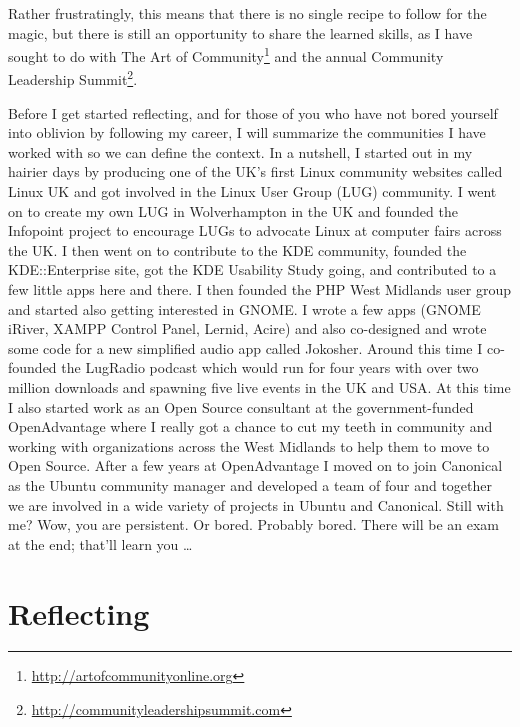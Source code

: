 Rather frustratingly, this means that there is no single recipe to follow for
the magic, but there is still an opportunity to share the learned skills, as I
have sought to do with The Art of
Community\footnote{\url{http://artofcommunityonline.org}} and the annual
Community Leadership
Summit\footnote{\url{http://communityleadershipsummit.com}}.

Before I get started reflecting, and for those of you who have not bored
yourself into oblivion by following my career, I will summarize the communities
I have worked with so we can define the context. In a nutshell, I started out in
my hairier days by producing one of the UK’s first Linux community websites
called Linux UK and got involved in the Linux User Group (LUG) community. I went
on to create my own LUG in Wolverhampton in the UK and founded the Infopoint
project to encourage LUGs to advocate Linux at computer fairs across the UK. I
then went on to contribute to the KDE community, founded the KDE::Enterprise
site, got the KDE Usability Study going, and contributed to a few little apps
here and there. I then founded the PHP West Midlands user group and started also
getting interested in GNOME. I wrote a few apps (GNOME iRiver, XAMPP Control
Panel, Lernid, Acire) and also co-designed and wrote some code for a new
simplified audio app called Jokosher. Around this time I co-founded the LugRadio
podcast which would run for four years with over two million downloads and
spawning five live events in the UK and USA. At this time I also started work as
an Open Source consultant at the government-funded OpenAdvantage where I really
got a chance to cut my teeth in community and working with organizations across
the West Midlands to help them to move to Open Source. After a few years at
OpenAdvantage I moved on to join Canonical as the Ubuntu community manager and
developed a team of four and together we are involved in a wide variety of
projects in Ubuntu and Canonical.
\newline
Still with me?
\newline
Wow, you are persistent. Or bored. Probably bored. There will be an exam at the
end; that’ll learn you \dots

\section*{Reflecting}

